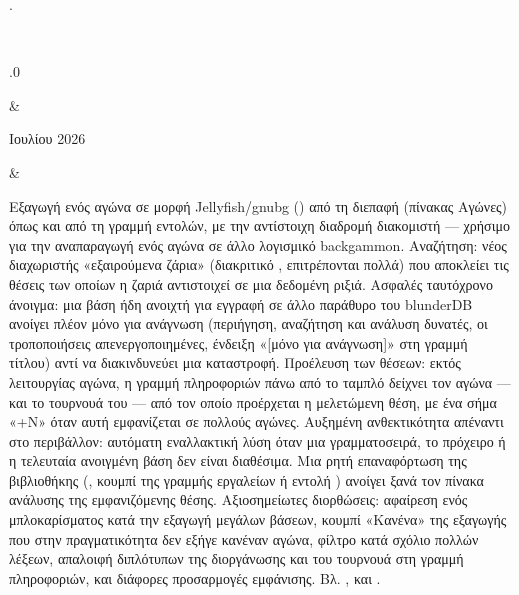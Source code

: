 \documentclass[letterpaper,10pt,greek]{sphinxmanual}
\begin{document}
\begin{savenotes}
\begin{longtable}{}
\begin{varwidth}[t]{}
{\hyperref[\detokenize{telecharge_install:telecharge-install}]{}}.
\sphinxbeforeendvarwidth
\end{varwidth}%
\\
\sphinxhline\begin{varwidth}[t]{}
.0
\sphinxbeforeendvarwidth
\end{varwidth}%
&\begin{varwidth}[t]{}
 Ιουλίου 2026
\sphinxbeforeendvarwidth
\end{varwidth}%
&\begin{varwidth}[t]{}
\sphinxAtStartPar
Εξαγωγή ενός αγώνα σε μορφή Jellyfish/gnubg () από τη διεπαφή (πίνακας Αγώνες) όπως και από τη γραμμή εντολών, με την αντίστοιχη διαδρομή διακομιστή — χρήσιμο για την αναπαραγωγή ενός αγώνα σε άλλο λογισμικό backgammon. Αναζήτηση: νέος διαχωριστής «εξαιρούμενα ζάρια» (διακριτικό , επιτρέπονται πολλά) που αποκλείει τις θέσεις των οποίων η ζαριά αντιστοιχεί σε μια δεδομένη ριξιά. Ασφαλές ταυτόχρονο άνοιγμα: μια βάση ήδη ανοιχτή για εγγραφή σε άλλο παράθυρο του blunderDB ανοίγει πλέον μόνο για ανάγνωση (περιήγηση, αναζήτηση και ανάλυση δυνατές, οι τροποποιήσεις απενεργοποιημένες, ένδειξη «{[}μόνο για ανάγνωση{]}» στη γραμμή τίτλου) αντί να διακινδυνεύει μια καταστροφή. Προέλευση των θέσεων: εκτός λειτουργίας αγώνα, η γραμμή πληροφοριών πάνω από το ταμπλό δείχνει τον αγώνα — και το τουρνουά του — από τον οποίο προέρχεται η μελετώμενη θέση, με ένα σήμα «+N» όταν αυτή εμφανίζεται σε πολλούς αγώνες. Αυξημένη ανθεκτικότητα απέναντι στο περιβάλλον: αυτόματη εναλλακτική λύση όταν μια γραμματοσειρά, το πρόχειρο ή η τελευταία ανοιγμένη βάση δεν είναι διαθέσιμα. Μια ρητή επαναφόρτωση της βιβλιοθήκης (, κουμπί της γραμμής εργαλείων ή εντολή ) ανοίγει ξανά τον πίνακα ανάλυσης της εμφανιζόμενης θέσης. Αξιοσημείωτες διορθώσεις: αφαίρεση ενός μπλοκαρίσματος κατά την εξαγωγή μεγάλων βάσεων, κουμπί «Κανένα» της εξαγωγής που στην πραγματικότητα δεν εξήγε κανέναν αγώνα, φίλτρο κατά σχόλιο πολλών λέξεων, απαλοιφή διπλότυπων της διοργάνωσης και του τουρνουά στη γραμμή πληροφοριών, και διάφορες προσαρμογές εμφάνισης. Βλ. {\hyperref[\detokenize{cmd_mode:cmd-mode}]{}}, {\hyperref[\detokenize{manuel:panneau-matchs}]{}} και {\hyperref[\detokenize{manuel:manuel}]{}}.

\end{varwidth}
\end{longtable}
\end{savenotes}
\end{document}
